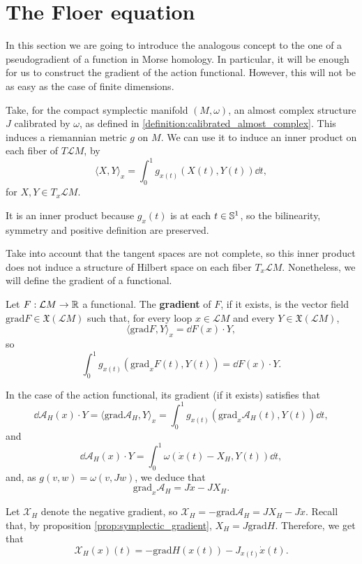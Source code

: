 \section{The Floer equation}

In this section we are going to introduce the analogous concept to the one of a pseudogradient of a function in Morse homology. In particular, it will be enough for us to construct the gradient of the action functional. However, this will not be as easy as the case of finite dimensions.

Take, for the compact symplectic manifold $(M,\omega)$, an almost complex structure $J$ calibrated by $\omega$, as defined in \ref{definition:calibrated_almost_complex}. This induces a riemannian metric $g$ on $M$. We can use it to induce an inner product on each fiber of $T\mathcal{L}M$, by
$$\langle X, Y \rangle_x = \int_0^1 g_{x(t)} (X(t), Y(t)) \dd t,$$
for $X,Y \in T_x\mathcal{L}M$.

It is an inner product because $g_x(t)$ is at each $t \in \mathbb{S}^1$, so the bilinearity, symmetry and positive definition are preserved.

Take into account that the tangent spaces are not complete, so this inner product does not induce a structure of Hilbert space on each fiber $T_x\mathcal{L}M$. Nonetheless, we will define the gradient of a functional.

\begin{deff}
Let $F : \mathcal{L}M \rightarrow \mathbb{R}$ a functional. The {\bf gradient} of $F$, if it exists, is the vector field $\text{grad}F \in \mathfrak{X}(\mathcal{L}M)$ such that, for every loop $x \in \mathcal{L}M$ and every $Y \in \mathfrak{X}(\mathcal{L}M)$,
$$\langle \text{grad}F, Y \rangle_x = \dd F(x) \cdot Y ,$$
so
$$\int_0^1 g_{x(t)}(\text{grad}_xF(t),Y(t)) = \dd F(x) \cdot Y .$$
\end{deff}

In the case of the action functional, its gradient (if it exists) satisfies that
$$\dd \mathcal{A}_H(x) \cdot Y = \langle \text{grad}\mathcal{A}_H, Y \rangle_x = \int_0^1 g_{x(t)}(\text{grad}_x\mathcal{A}_H(t),Y(t)) \dd t ,$$
and
$$\dd \mathcal{A}_H(x) \cdot Y = \int_0^1 \omega(\dot{x}(t)-X_H,Y(t)) \dd t ,$$
and, as $g(v,w) = \omega(v,Jw)$, we deduce that
$$\text{grad}_x\mathcal{A}_H = J\dot{x} - J X_H .$$

Let $\mathcal{X}_H$ denote the negative gradient, so $\mathcal{X}_H = - \text{grad}\mathcal{A}_H = J X_H - J \dot{x}$. Recall that, by proposition \ref{prop:symplectic_gradient}, $X_H = J \text{grad} H$. Therefore, we get that
$$\mathcal{X}_H(x)(t) = - \text{grad}H(x(t)) - J_{x(t)} \dot{x}(t) .$$


